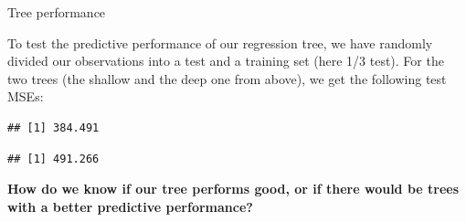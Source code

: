 \documentclass[10pt,ignorenonframetext,]{beamer}
\newenvironment{Shaded}{\begin{snugshade}}{\end{snugshade}}
\newcommand{\KeywordTok}[1]{\textcolor[rgb]{0.13,0.29,0.53}{\textbf{#1}}}
\newcommand{\DataTypeTok}[1]{\textcolor[rgb]{0.13,0.29,0.53}{#1}}
\newcommand{\DecValTok}[1]{\textcolor[rgb]{0.00,0.00,0.81}{#1}}
\newcommand{\StringTok}[1]{\textcolor[rgb]{0.31,0.60,0.02}{#1}}
\newcommand{\OperatorTok}[1]{\textcolor[rgb]{0.81,0.36,0.00}{\textbf{#1}}}
\newcommand{\NormalTok}[1]{#1}
\begin{document}
\begin{frame}[fragile]

\begin{block}{Tree performance}

\vspace{2mm}

To test the predictive performance of our regression tree, we have
randomly divided our observations into a test and a training set (here
1/3 test). For the two trees (the shallow and the deep one from above),
we get the following test MSEs:

\begin{Shaded}
\end{Shaded}

\begin{verbatim}
## [1] 384.491
\end{verbatim}

\begin{Shaded}
\end{Shaded}

\begin{verbatim}
## [1] 491.266
\end{verbatim}

\vspace{1mm}

\textbf{How do we know if our tree performs good, or if there would be
trees with a better predictive performance?}

\end{block}

\end{frame}
\end{document}
